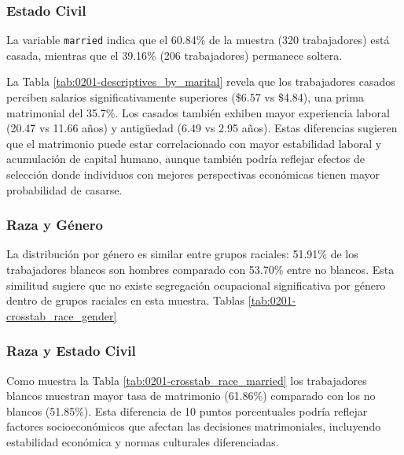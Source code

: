 \documentclass[12pt]{article}
\begin{document}


\subsubsection*{Estado Civil}

La variable \texttt{married} indica que el 60.84\% de la muestra (320 trabajadores) está casada, mientras que el 39.16\% (206 trabajadores) permanece soltera.

La Tabla \ref{tab:0201-descriptives_by_marital} revela que los trabajadores casados perciben salarios significativamente superiores (\$6.57 vs \$4.84), una prima matrimonial del 35.7\%. Los casados también exhiben mayor experiencia laboral (20.47 vs 11.66 años) y antigüedad (6.49 vs 2.95 años). Estas diferencias sugieren que el matrimonio puede estar correlacionado con mayor estabilidad laboral y acumulación de capital humano, aunque también podría reflejar efectos de selección donde individuos con mejores perspectivas económicas tienen mayor probabilidad de casarse.



\subsubsection*{Raza y Género}

La distribución por género es similar entre grupos raciales: 51.91\% de los trabajadores blancos son hombres comparado con 53.70\% entre no blancos. Esta similitud sugiere que no existe segregación ocupacional significativa por género dentro de grupos raciales en esta muestra. Tablas \ref{tab:0201-crosstab_race_gender}



\subsubsection*{Raza y Estado Civil}

Como muestra la Tabla \ref{tab:0201-crosstab_race_married} los trabajadores blancos muestran mayor tasa de matrimonio (61.86\%) comparado con los no blancos (51.85\%). Esta diferencia de 10 puntos porcentuales podría reflejar factores socioeconómicos que afectan las decisiones matrimoniales, incluyendo estabilidad económica y normas culturales diferenciadas.


\end{document}
